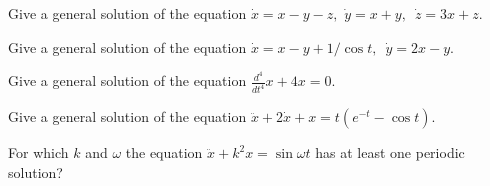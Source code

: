 \begin{task}
	Give a general solution of the equation $\dot{x}=x-y-z,$ $\dot{y}=x+y,$\ $\dot{z}=3x+z.$
\end{task}

\begin{task}
	Give a general solution of the equation $\dot{x} = x-y+1/\cos t,$\ $\dot{y}=2x-y.$
\end{task}

\begin{task}
	Give a general solution of the equation $\frac{d^{4}}{dt^{4}}x +4x=0.$
\end{task}

\begin{task}
	Give a general solution of the equation $\ddot{x}+2\dot{x}+x=t(e^{-t}-\cos t)$.
\end{task}

\begin{task}
	For which $k$ and $\omega$ the equation $\ddot{x} +k^{2}x= \sin \omega t$ has at least one periodic solution?
\end{task}
